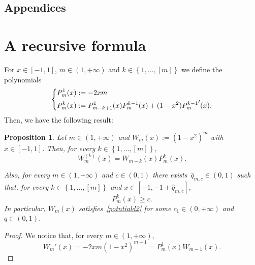 \documentclass[12pt]{article}
\numberwithin{equation}{section}
\newtheorem{prop}[thm]{Proposition}
\renewcommand{\geq}{\geqslant}
\begin{document}
\begin{appendix}
\begin{center}\section*{Appendices}
\end{center}

\section{A recursive formula}
For $x\in [-1,1]$, $m\in(1,+\infty)$ and $k\in \left\lbrace 1,\dots, [m] \right\rbrace$  we define the polynomials 
\begin{equation*}
\begin{dcases}
P_m^1(x):=-2xm\\
P_{m}^k(x):=P_{m-k+1}^{1}(x)P_{m}^{k-1}(x)+(1-x^2){P_{m}^{k-1}}'(x).
\end{dcases}
\end{equation*}
Then, we have the following result: 
\begin{prop}\label{colllise}
Let $m\in (1,+\infty)$ and $W_m(x):=(1-x^2)^m$ with $x\in[-1,1]$. Then, for every $k\in \left\lbrace 1,\dots, [m] \right\rbrace$,
\begin{equation}\label{telenious}
W_m^{(k)}(x)=W_{m-k}(x)P_m^k(x).
\end{equation}

Also, for every $m\in (1,+\infty)$ and $c\in (0,1)$ there exists~$\hat{q}_{m,c}\in (0,1)$ such that, for every $k\in \left\lbrace 1,\dots, \left[m\right] \right\rbrace$ and $x\in [-1,-1+\hat{q}_{m,c}]$, 
\begin{equation}\label{term-0987}
P_m^k(x)\geq c.
\end{equation}
In particular, $W_m(x)$ satisfies~\eqref{potntiald2} for some $c_1\in (0,+\infty)$ and $q\in (0,1)$. 
\end{prop}


\begin{proof} 
We notice that, for every $m\in (1,+\infty)$,
\begin{equation}\label{klkp.mtv5}
W_m'(x)=-2xm(1-x^2)^{m-1}=P_m^1(x)W_{m-1}(x).
\end{equation}


\end{proof}
\end{appendix}
\end{document}
